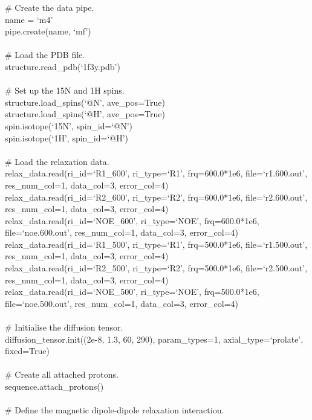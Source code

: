 \begin{exampleenv}
\# Create the data pipe. \\
name = `m4' \\
pipe.create(name, `mf') \\
 \\
\# Load the PDB file. \\
structure.read\_pdb(`1f3y.pdb') \\
 \\
\# Set up the 15N and 1H spins. \\
structure.load\_spins(`@N', ave\_pos=True) \\
structure.load\_spins(`@H', ave\_pos=True) \\
spin.isotope(`15N', spin\_id=`@N') \\
spin.isotope(`1H', spin\_id=`@H') \\
 \\
\# Load the relaxation data. \\
relax\_data.read(ri\_id=`R1\_600',  ri\_type=`R1',  frq=600.0*1e6, file=`r1.600.out', res\_num\_col=1, data\_col=3, error\_col=4) \\
relax\_data.read(ri\_id=`R2\_600',  ri\_type=`R2',  frq=600.0*1e6, file=`r2.600.out', res\_num\_col=1, data\_col=3, error\_col=4) \\
relax\_data.read(ri\_id=`NOE\_600', ri\_type=`NOE', frq=600.0*1e6, file=`noe.600.out', res\_num\_col=1, data\_col=3, error\_col=4) \\
relax\_data.read(ri\_id=`R1\_500',  ri\_type=`R1',  frq=500.0*1e6, file=`r1.500.out', res\_num\_col=1, data\_col=3, error\_col=4) \\
relax\_data.read(ri\_id=`R2\_500',  ri\_type=`R2',  frq=500.0*1e6, file=`r2.500.out', res\_num\_col=1, data\_col=3, error\_col=4) \\
relax\_data.read(ri\_id=`NOE\_500', ri\_type=`NOE', frq=500.0*1e6, file=`noe.500.out', res\_num\_col=1, data\_col=3, error\_col=4) \\
 \\
\# Initialise the diffusion tensor. \\
diffusion\_tensor.init((2e-8, 1.3, 60, 290), param\_types=1, axial\_type=`prolate', fixed=True) \\
 \\
\# Create all attached protons. \\
sequence.attach\_protons() \\
 \\
\# Define the magnetic dipole-dipole relaxation interaction. \\

\end{exampleenv}
